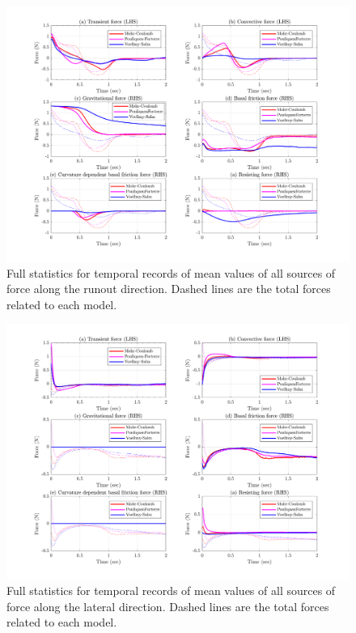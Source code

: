 \documentclass{article}
\begin{document}
\begin{figure}[H]
        \centering
        \includegraphics[width=1\textwidth]{InclinedPlane/GlobalRecords/Fxall.png}
        \caption{Full statistics for temporal records of mean values of all sources of force along the runout direction. Dashed lines are the total forces related to each model.}
        \label{fig:Ramp-ForcexAll}
\end{figure}

\begin{figure}[H]
        \centering
        \includegraphics[width=1\textwidth]{InclinedPlane/GlobalRecords/Fyall.png}
        \caption{Full statistics for temporal records of mean values of all sources of force along the lateral direction. Dashed lines are the total forces related to each model.}
        \label{fig:Ramp-ForceyAll}
\end{figure}
\end{document}
